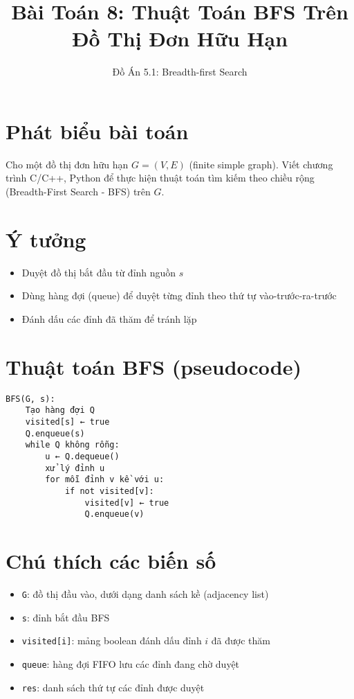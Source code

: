 \documentclass[12pt]{article}
\title{Bài Toán 8: Thuật Toán BFS Trên Đồ Thị Đơn Hữu Hạn}
\author{Đồ Án 5.1: Breadth-first Search}
\date{}
\begin{document}
\maketitle

\section*{Phát biểu bài toán}
Cho một đồ thị đơn hữu hạn $G = (V, E)$ (finite simple graph). Viết chương trình C/C++, Python để thực hiện thuật toán tìm kiếm theo chiều rộng (Breadth-First Search - BFS) trên $G$.

\section*{Ý tưởng}
\begin{itemize}
    \item Duyệt đồ thị bắt đầu từ đỉnh nguồn $s$
    \item Dùng hàng đợi (queue) để duyệt từng đỉnh theo thứ tự vào-trước-ra-trước
    \item Đánh dấu các đỉnh đã thăm để tránh lặp
\end{itemize}

\section*{Thuật toán BFS (pseudocode)}
\begin{verbatim}
BFS(G, s):
    Tạo hàng đợi Q
    visited[s] ← true
    Q.enqueue(s)
    while Q không rỗng:
        u ← Q.dequeue()
        xử lý đỉnh u
        for mỗi đỉnh v kề với u:
            if not visited[v]:
                visited[v] ← true
                Q.enqueue(v)
\end{verbatim}

\section*{Chú thích các biến số}
\begin{itemize}
    \item \texttt{G}: đồ thị đầu vào, dưới dạng danh sách kề (adjacency list)
    \item \texttt{s}: đỉnh bắt đầu BFS
    \item \texttt{visited[i]}: mảng boolean đánh dấu đỉnh $i$ đã được thăm
    \item \texttt{queue}: hàng đợi FIFO lưu các đỉnh đang chờ duyệt
    \item \texttt{res}: danh sách thứ tự các đỉnh được duyệt
\end{itemize}
\end{document}
